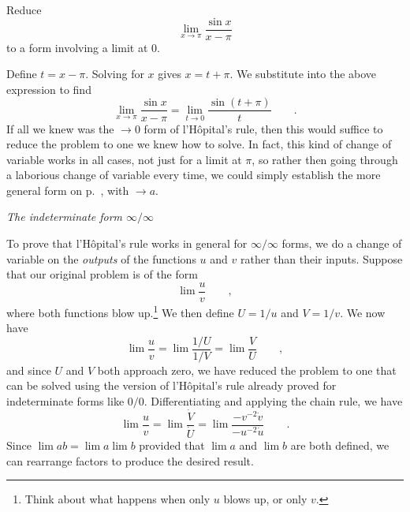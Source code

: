 \begin{eg}
\egquestion
Reduce
\begin{equation*}
  \lim_{x\rightarrow \pi}\frac{\sin x}{x-\pi}
\end{equation*}
to a form involving a limit at 0.

\eganswer
Define $t=x-\pi$. Solving for $x$ gives $x=t+\pi$. We substitute into the above expression
to find
\begin{equation*}
  \lim_{x\rightarrow \pi}\frac{\sin x}{x-\pi} =   \lim_{t\rightarrow 0}\frac{\sin (t+\pi)}{t} \qquad .
\end{equation*}
If all we knew was the $\rightarrow0$ form of l'H\^{o}pital's rule, then this would suffice
to reduce the problem to one we knew how to solve. In fact, this kind of change of variable works in
all cases, not just for a limit at $\pi$, so rather then going through a laborious change of variable
every time, we could simply establish the more general form on p.~\pageref{lhospital-simple}, with
$\rightarrow a$.
\end{eg}

\emph{The indeterminate form $\infty/\infty$}\label{lhospital-inf-inf}

To prove that l'H\^{o}pital's rule works in general for $\infty/\infty$ forms, 
we do a change of variable on the \emph{outputs} of the functions $u$ and $v$
rather than their inputs. Suppose that our original problem is of the form
\begin{equation*}
  \lim \frac{u}{v} \qquad ,
\end{equation*}
where both functions blow up.\footnote{Think about what happens when only $u$ blows up,
or only $v$.} We then define $U=1/u$ and $V=1/v$. We now have
\begin{equation*}
  \lim \frac{u}{v} = \lim \frac{1/U}{1/V} =\lim \frac{V}{U} \qquad ,
\end{equation*}
and since $U$ and $V$ both approach zero, we have reduced the problem to one that can be solved
using the version of l'H\^{o}pital's rule already proved
for indeterminate forms like $0/0$. Differentiating and applying the chain rule, we have
\begin{equation*}
  \lim \frac{u}{v} = \lim \frac{\dot{V}}{\dot{U}} = \lim \frac{-v^{-2}\dot{v}}{-u^{-2}\dot{u}} \qquad .
\end{equation*}
Since $\lim ab=\lim a \lim b$ provided that $\lim a$ and $\lim b$ are both defined, we can rearrange
factors to produce the desired result.



